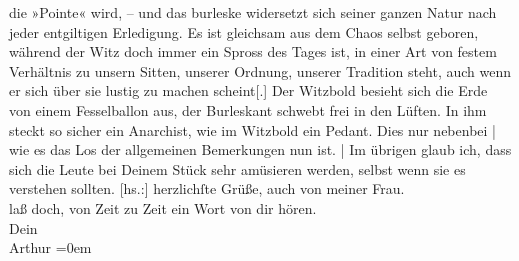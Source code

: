 \begin{ledgroupsized}[t]{13cm}
               die »Pointe« wird, \introOben{}–\introOben{} und das burleske widersetzt sich seiner
               ganzen Natur nach jeder entgiltigen Erledigung. Es ist gleichsam aus dem Chaos selbst
               geboren, während der Witz doch immer ein Spross des Tages ist, in einer Art von
               festem Verhältnis zu unsern Sitten, unserer Ordnung, unserer Tradition steht, auch
               wenn er sich über sie lustig zu machen scheint{[}.{]} Der Witz\introOben{}bold\introOben{} besieht sich die Erde von einem Fesselballon aus, der
               Burleskant schwebt frei in den Lüften. In ihm steckt so sicher ein Anarchist, wie im
               Witzbold ein Pedant. Dies nur nebenbei | wie es das Los der allgemeinen Bemerkungen
               nun ist. | Im übrigen glaub ich, dass sich die Leute bei Deinem Stück sehr amüsieren
               werden, selbst wenn sie es verstehen sollten.\pend
           \pstart
           {[}hs.:{]} herzlichſte Grüße, auch von meiner Frau.{\\[\baselineskip]}laß doch, von Zeit zu Zeit ein Wort von dir hören.{\\[\baselineskip]}Dein{\\[\baselineskip]}\spacefill\mbox{Arthur}\pend
           \leftskip=0em{}
         
         \endnumbering{}\end{ledgroupsized}  \newcommand{\dateiname}{L01721}\newcommand{\titel}{Arthur Schnitzler an Hermann Bahr, 11. 10. 1907}\newcommand{\editorInnen}{ Kurt Ifkovits,  Martin Anton Müller}
      